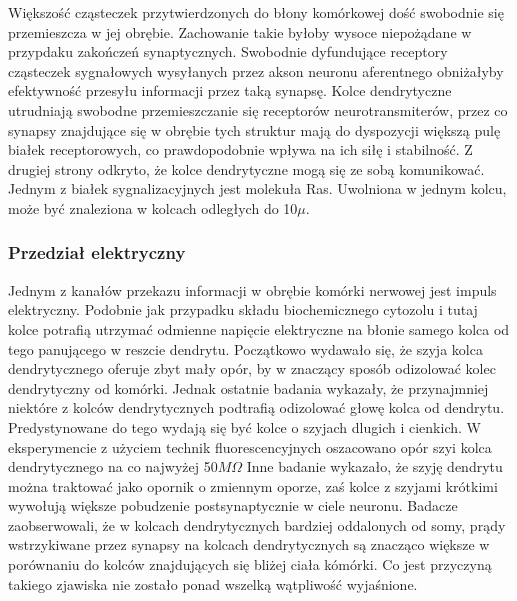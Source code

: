 \documentclass{article}
\begin{document}
Większość cząsteczek przytwierdzonych do błony komórkowej dość swobodnie się przemieszcza w jej obrębie.
Zachowanie takie byłoby wysoce niepożądane w przypdaku zakończeń synaptycznych. 
Swobodnie dyfundujące receptory cząsteczek sygnałowych wysyłanych przez akson neuronu aferentnego obniżałyby efektywność przesyłu informacji przez taką synapsę. 
Kolce dendrytyczne utrudniają swobodne przemieszczanie się receptorów neurotransmiterów, przez co synapsy znajdujące się w obrębie tych struktur mają do dyspozycji większą pulę białek receptorowych, co prawdopodobnie wpływa na ich siłę i stabilność.
Z drugiej strony odkryto, że kolce dendrytyczne mogą się ze sobą komunikować.
Jednym z białek sygnalizacyjnych jest molekuła Ras.
Uwolniona w jednym kolcu, może być znaleziona w kolcach odległych do 10\(\mu\).

\subsubsection{Przedział elektryczny}
Jednym z kanałów przekazu informacji w obrębie komórki nerwowej jest impuls elektryczny.
Podobnie jak przypadku składu biochemicznego cytozolu i tutaj kolce potrafią utrzymać odmienne napięcie elektryczne na błonie samego kolca od tego panującego w reszcie dendrytu.
Początkowo wydawało się, że szyja kolca dendrytycznego oferuje zbyt mały opór, by w znaczący sposób odizolować kolec dendrytyczny od komórki. 
Jednak ostatnie badania wykazały, że przynajmniej niektóre z kolców dendrytycznych podtrafią odizolować głowę kolca od dendrytu.
Predystynowane do tego wydają się być kolce o szyjach dlugich i cienkich.
W eksperymencie z użyciem technik fluorescencyjnych oszacowano opór szyi kolca dendrytycznego na co najwyżej 50\(M\Omega\)
Inne badanie wykazało, że szyję dendrytu można traktować jako opornik o zmiennym oporze, zaś kolce z szyjami krótkimi wywołują większe pobudzenie postsynaptycznie w ciele neuronu.
Badacze zaobserwowali, że w kolcach dendrytycznych bardziej oddalonych od somy, prądy wstrzykiwane przez synapsy na kolcach dendrytycznych są znacząco większe w porównaniu do kolców znajdujących się bliżej ciała kómórki.
Co jest przyczyną takiego zjawiska nie zostało ponad wszelką wątpliwość wyjaśnione\citep{Sala2014}.
\end{document}
